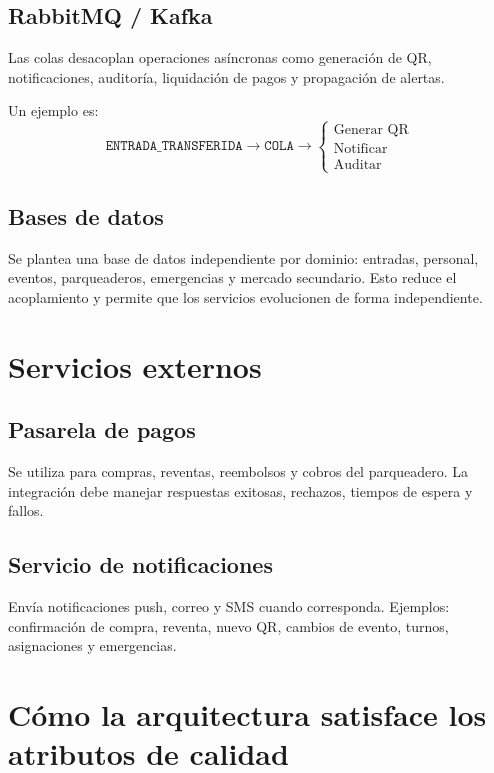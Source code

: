 \documentclass[12pt,a4paper]{article}
\begin{document}
\subsection{RabbitMQ / Kafka}

Las colas desacoplan operaciones asíncronas como generación de QR, notificaciones, auditoría, liquidación de pagos y propagación de alertas.

Un ejemplo es:
\[
\texttt{ENTRADA\_TRANSFERIDA}
\rightarrow
\texttt{COLA}
\rightarrow
\begin{cases}
\text{Generar QR}\\
\text{Notificar}\\
\text{Auditar}
\end{cases}
\]

\subsection{Bases de datos}

Se plantea una base de datos independiente por dominio: entradas, personal, eventos, parqueaderos, emergencias y mercado secundario. Esto reduce el acoplamiento y permite que los servicios evolucionen de forma independiente.

\section{Servicios externos}

\subsection{Pasarela de pagos}

Se utiliza para compras, reventas, reembolsos y cobros del parqueadero. La integración debe manejar respuestas exitosas, rechazos, tiempos de espera y fallos.

\subsection{Servicio de notificaciones}

Envía notificaciones push, correo y SMS cuando corresponda. Ejemplos: confirmación de compra, reventa, nuevo QR, cambios de evento, turnos, asignaciones y emergencias.

\section{Cómo la arquitectura satisface los atributos de calidad}
\end{document}
